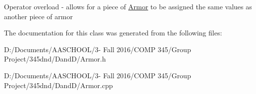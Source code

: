 Operator overload -\/ allows for a piece of \hyperlink{class_armor}{Armor} to be assigned the same values as another piece of armor 

The documentation for this class was generated from the following files\+:\begin{DoxyCompactItemize}
\item 
D\+:/\+Documents/\+A\+A\+S\+C\+H\+O\+O\+L/3-\/ Fall 2016/\+C\+O\+M\+P 345/\+Group Project/345dnd/\+Dand\+D/Armor.\+h\item 
D\+:/\+Documents/\+A\+A\+S\+C\+H\+O\+O\+L/3-\/ Fall 2016/\+C\+O\+M\+P 345/\+Group Project/345dnd/\+Dand\+D/Armor.\+cpp\end{DoxyCompactItemize}
